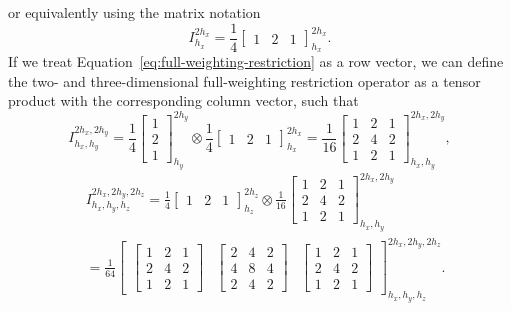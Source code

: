 or equivalently using the matrix notation
\begin{equation}
	I_{h_x}^{2h_x} =  \frac{1}{4} \begin{bmatrix}
			1 & 2 & 1
		\end{bmatrix}_{h_x}^{2h_x}.
	\label{eq:full-weighting-restriction}
\end{equation} 
If we treat Equation~\eqref{eq:full-weighting-restriction} as a row vector, we can define the two- and three-dimensional full-weighting restriction operator as a tensor product with the corresponding column vector, such that
\begin{equation}
	I^{2h_x, 2h_y}_{h_x, h_y} = \frac{1}{4} \begin{bmatrix}
		1 \\ 2 \\ 1
	\end{bmatrix}_{h_y}^{2h_y} \otimes \frac{1}{4} \begin{bmatrix}
		1 & 2 & 1
	\end{bmatrix}_{h_x}^{2h_x} =
\frac{1}{16} 
\begin{bmatrix}
	1 & 2 & 1 \\
	2 & 4 & 2 \\
	1 & 2 & 1
\end{bmatrix}^{2h_x, 2h_y}_{h_x, h_y},
\end{equation} 
\begin{equation}
\begin{split}
	& I^{2h_x, 2h_y, 2h_z}_{h_x, h_y, h_z} = \frac{1}{4} \begin{bmatrix}
		1 & 2 & 1
	\end{bmatrix}_{h_z}^{2h_z} \otimes 
	\frac{1}{16} 
	\begin{bmatrix}
		1 & 2 & 1 \\
		2 & 4 & 2 \\
		1 & 2 & 1
	\end{bmatrix}^{2h_x, 2h_y}_{h_x, h_y} \\
& = \frac{1}{64} \begin{bmatrix}
\begin{bmatrix}
	1 & 2 & 1 \\
	2 & 4 & 2 \\
	1 & 2 & 1
\end{bmatrix} &	\begin{bmatrix}
2 & 4 & 2 \\
4 & 8 & 4 \\
2 & 4 & 2
\end{bmatrix} &
\begin{bmatrix}
	1 & 2 & 1 \\
	2 & 4 & 2 \\
	1 & 2 & 1
\end{bmatrix}
\end{bmatrix}^{2h_x, 2h_y, 2h_z}_{h_x, h_y, h_z}.
\end{split}
\end{equation}
